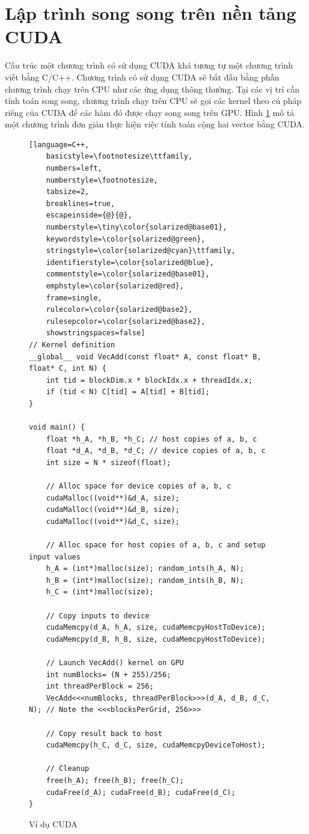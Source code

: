 \documentclass[../../main.tex]{subfiles}
\begin{document}
\section{Lập trình song song trên nền tảng CUDA}
Cấu trúc một chương trình có sử dụng CUDA khá tương tự một chương trình viết bằng C/C++. Chương trình có sử dụng CUDA sẽ bắt đầu bằng phần chương trình chạy trên CPU như các ứng dụng thông thường. Tại các vị trí cần tính toán song song, chương trình chạy trên CPU sẽ gọi các kernel theo cú pháp riêng của CUDA để các hàm đó được chạy song song trên GPU. Hình \ref{fig:cuda-example} mô tả một chương trình đơn giản thực hiện việc tính toán cộng hai vector bằng CUDA.

\begin{figure}[H]
\begin{lstlisting}[language=C++,
    basicstyle=\footnotesize\ttfamily,
    numbers=left,
    numberstyle=\footnotesize,
    tabsize=2,
    breaklines=true,
    escapeinside={@}{@},
    numberstyle=\tiny\color{solarized@base01},
    keywordstyle=\color{solarized@green},
    stringstyle=\color{solarized@cyan}\ttfamily,
    identifierstyle=\color{solarized@blue},
    commentstyle=\color{solarized@base01},
    emphstyle=\color{solarized@red},
    frame=single,
    rulecolor=\color{solarized@base2},
    rulesepcolor=\color{solarized@base2},
    showstringspaces=false]
// Kernel definition
__global__ void VecAdd(const float* A, const float* B, float* C, int N) {
    int tid = blockDim.x * blockIdx.x + threadIdx.x;
    if (tid < N) C[tid] = A[tid] + B[tid];
}
        
void main() {
    float *h_A, *h_B, *h_C; // host copies of a, b, c
    float *d_A, *d_B, *d_C; // device copies of a, b, c
    int size = N * sizeof(float);

    // Alloc space for device copies of a, b, c
    cudaMalloc((void**)&d_A, size);
    cudaMalloc((void**)&d_B, size);
    cudaMalloc((void**)&d_C, size);

    // Alloc space for host copies of a, b, c and setup input values
    h_A = (int*)malloc(size); random_ints(h_A, N);
    h_B = (int*)malloc(size); random_ints(h_B, N);
    h_C = (int*)malloc(size); 

    // Copy inputs to device
    cudaMemcpy(d_A, h_A, size, cudaMemcpyHostToDevice);
    cudaMemcpy(d_B, h_B, size, cudaMemcpyHostToDevice);

    // Launch VecAdd() kernel on GPU
    int numBlocks= (N + 255)/256;
    int threadPerBlock = 256;
    VecAdd<<<numBlocks, threadPerBlock>>>(d_A, d_B, d_C, N); // Note the <<<blocksPerGrid, 256>>>

    // Copy result back to host
    cudaMemcpy(h_C, d_C, size, cudaMemcpyDeviceToHost);

    // Cleanup
    free(h_A); free(h_B); free(h_C);
    cudaFree(d_A); cudaFree(d_B); cudaFree(d_C); 
}
\end{lstlisting}
\caption{Ví dụ CUDA}
\label{fig:cuda-example}
\end{figure}
\end{document}
